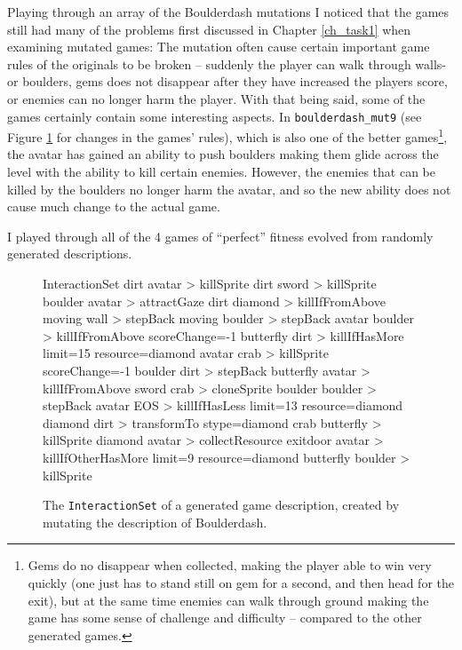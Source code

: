 \documentclass[a4paper,titlepage,final]{report}
\begin{document}
Playing through an array of the Boulderdash mutations I noticed that the games still had many of the problems first discussed in Chapter \ref{ch_task1} when examining mutated games:
The mutation often cause certain important game rules of the originals to be broken -- suddenly the player can walk through walls- or boulders, gems does not disappear after they have increased the players score, or enemies can no longer harm the player.
With that being said, some of the games certainly contain some interesting aspects.
In \texttt{boulderdash_mut9} (see Figure \ref{fig:evolved_boulderdash} for changes in the games' rules), which is also one of the better games\footnote{Gems do no disappear when collected, making the player able to win very quickly (one just has to stand still on gem for a second, and then head for the exit), but at the same time enemies can walk through ground making the game has some sense of challenge and difficulty -- compared to the other generated games.}, the avatar has gained an ability to push boulders making them glide across the level with the ability to kill certain enemies.
However, the enemies that can be killed by the boulders no longer harm the avatar, and so the new ability does not cause much change to the actual game.

I played through all of the 4 games of ``perfect'' fitness evolved from randomly generated descriptions.



\begin{figure}[!ht]
\centering
\begin{vgdldesc}[linewidth=14cm]
	InteractionSet
		dirt avatar > killSprite
		dirt sword > killSprite
		boulder avatar > attractGaze
		dirt diamond > killIfFromAbove
		moving wall > stepBack
		moving boulder > stepBack
		avatar boulder > killIfFromAbove scoreChange=-1
		butterfly dirt > killIfHasMore limit=15 resource=diamond
		avatar crab > killSprite scoreChange=-1
		boulder dirt > stepBack
		butterfly avatar > killIfFromAbove
		sword crab > cloneSprite
		boulder boulder > stepBack
		avatar EOS > killIfHasLess limit=13 resource=diamond
		diamond dirt > transformTo stype=diamond
		crab butterfly > killSprite
		diamond avatar > collectResource
		exitdoor avatar > killIfOtherHasMore limit=9 resource=diamond
		butterfly boulder > killSprite
\end{vgdldesc}
\caption{The \texttt{InteractionSet} of a generated game description, created by mutating the description of Boulderdash.}
\label{fig:evolved_boulderdash}
\end{figure}
\end{document}
